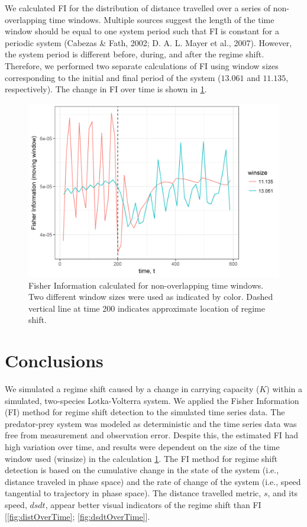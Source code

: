 \documentclass[12pt,twoside,openany]{reedthesis}
\begin{document}
We calculated FI for the distribution of distance travelled over a
series of non-overlapping time windows. Multiple sources suggest the
length of the time window should be equal to one system period such that
FI is constant for a periodic system (Cabezas \& Fath, 2002; D. A. L.
Mayer et al., 2007). However, the system period is different before,
during, and after the regime shift. Therefore, we performed two separate
calculations of FI using window sizes corresponding to the initial and
final period of the system (\(13.061\) and \(11.135\), respectively).
The change in FI over time is shown in \ref{fig:fiOverTime}.
\begin{figure}
\includegraphics[width=27.08in]{./chapterFiles/fiGuide/figures/fiOverTime} \caption{Fisher Information calculated for non-overlapping time windows. Two different window sizes were used as indicated by color. Dashed vertical line at time 200 indicates approximate location of regime shift.}\label{fig:fiOverTime}
\end{figure}
\section{Conclusions}\label{conclusions}

We simulated a regime shift caused by a change in carrying capacity
(\(K\)) within a simulated, two-species Lotka-Volterra system. We
applied the Fisher Information (FI) method for regime shift detection to
the simulated time series data. The predator-prey system was modeled as
deterministic and the time series data was free from measurement and
observation error. Despite this, the estimated FI had high variation
over time, and results were dependent on the size of the time window
used (winsize) in the calculation \ref{fig:fiOverTime}. The FI method
for regime shift detection is based on the cumulative change in the
state of the system (i.e., distance traveled in phase space) and the
rate of change of the system (i.e., speed tangential to trajectory in
phase space). The distance travelled metric, \(s\), and its speed,
\(dsdt\), appear better visual indicators of the regime shift than FI
{[}\ref{fig:distOverTime}; \ref{fig:dsdtOverTime}{]}.
\end{document}
